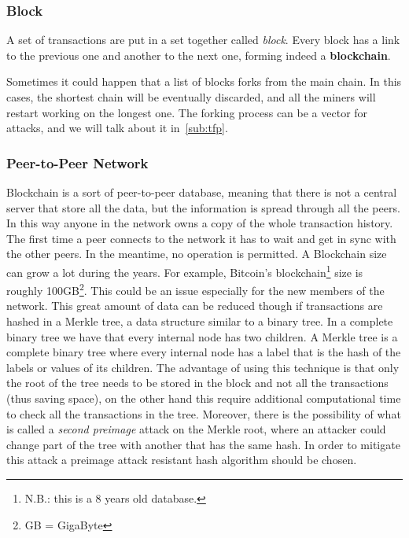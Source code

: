 \subsubsection{Block}
A set of transactions are put in a set together called \textit{block}. Every
block has a link to the previous one and another to the next one, forming
indeed a \textbf{blockchain}.

\label{sub:fork}
Sometimes it could happen that a list of blocks forks from the main chain. In
this cases, the shortest chain will be eventually discarded, and all the miners
will restart working on the longest one\cite{sok15}. The forking process can be
a vector for attacks, and we will talk about it in~\ref{sub:tfp}.

\subsubsection{Peer-to-Peer Network}

Blockchain is a sort of peer-to-peer database, meaning that there is not a
central server that store all the data, but the information is spread through
all the peers.
In this way anyone in the network owns a copy of the whole transaction history.
The first time a peer connects to the network it has to wait and get in sync
with the other peers. In the meantime, no operation is permitted. A Blockchain
size can grow a lot during the years. For example, Bitcoin's
blockchain\footnote{N.B.: this is a 8 years old database.} size is roughly
100GB\footnote{GB = GigaByte}. This could be an issue especially for the new
members of the network.
This great amount of data can be reduced though if transactions are hashed in a
Merkle tree, a data structure similar to a binary tree. In a complete binary
tree we have that every internal node has two children. A Merkle tree is
a complete binary tree where every internal node has a label that is the hash
of the labels or values of its children\cite{szydlo04}. The advantage of using
this technique is that only the root of the tree needs to be stored in the
block and not all the transactions\cite{nakamoto08} (thus saving space), on the
other hand this require additional computational time to check all the
transactions in the tree. Moreover, there is the possibility of what is called a
\textit{second preimage} attack on the Merkle root, where an attacker could
change part of the tree with another that has the same hash\cite{rogaway04}. In
order to mitigate this attack a preimage attack resistant hash algorithm should
be chosen.



